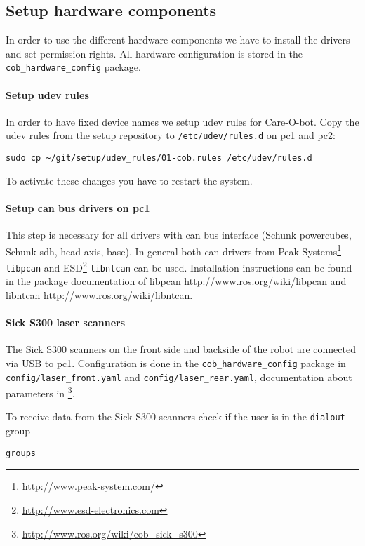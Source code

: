 \subsection{Setup hardware components}
In order to use the different hardware components we have to install the drivers and set permission rights. All hardware configuration is stored in the \texttt{cob\_hardware\_config} package.

\paragraph{Setup udev rules}
In order to have fixed device names we setup udev rules for Care-O-bot. Copy the udev rules from the setup repository to \texttt{/etc/udev/rules.d} on pc1 and pc2:
\begin{lstlisting}
sudo cp ~/git/setup/udev_rules/01-cob.rules /etc/udev/rules.d
\end{lstlisting}
To activate these changes you have to restart the system.

\paragraph{Setup can bus drivers on pc1}
This step is necessary for all drivers with can bus interface (Schunk powercubes, Schunk sdh, head axis, base). In general both can drivers from Peak Systems\footnote{\url{http://www.peak-system.com/}} \texttt{libpcan} and ESD\footnote{\url{http://www.esd-electronics.com}} \texttt{libntcan} can be used. Installation instructions can be found in the package documentation of libpcan \url{http://www.ros.org/wiki/libpcan} and libntcan \url{http://www.ros.org/wiki/libntcan}.

\paragraph{Sick S300 laser scanners}
The Sick S300 scanners on the front side and backside of the robot are connected via USB to pc1. Configuration is done in the \texttt{cob\_hardware\_config} package in \texttt{config/laser\_front.yaml} and \texttt{config/laser\_rear.yaml}, documentation about parameters in \footnote{\url{http://www.ros.org/wiki/cob_sick_s300}}.

To receive data from the Sick S300 scanners check if the user is in the \texttt{dialout} group
\begin{lstlisting}
groups
\end{lstlisting}

